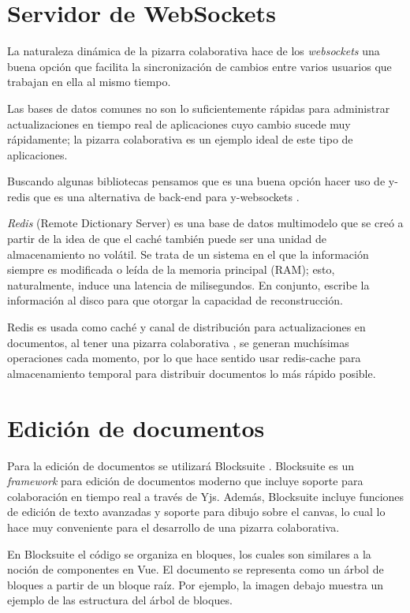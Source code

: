 \documentclass[a4paper, oneside, final]{scrartcl}
\begin{document}
\section{Servidor de WebSockets}
La naturaleza dinámica de la pizarra colaborativa
hace de los \textit{websockets} una buena opción que facilita
 la sincronización de cambios entre
 varios usuarios que trabajan en ella al mismo tiempo.

Las bases de datos comunes no son lo suficientemente r\'apidas para administrar actualizaciones en tiempo real de aplicaciones cuyo cambio sucede muy rápidamente; la pizarra colaborativa es un ejemplo ideal de este tipo de aplicaciones.

Buscando algunas bibliotecas pensamos que es una buena opción hacer uso de y-redis que es una alternativa de back-end para y-websockets .

\textit{Redis} (Remote Dictionary Server) es una base de datos multimodelo que se cre\'o a partir de la idea de que el cach\'e tambi\'en puede ser una unidad de almacenamiento no vol\'atil. Se trata de un sistema en el que la informaci\'on siempre es modificada o le\'ida de la memoria principal (RAM); esto, naturalmente, induce una latencia de milisegundos. En conjunto, escribe la informaci\'on al disco para que otorgar la capacidad de reconstrucci\'on.

Redis es usada como cach\'e y canal de distribuci\'on para actualizaciones en documentos, al tener una pizarra colaborativa , se generan much\'isimas operaciones cada momento, por lo que hace sentido usar redis-cache para almacenamiento temporal para distribuir documentos lo más rápido posible.


\section{Edición de documentos}

Para la edición de documentos se utilizará Blocksuite \cite{unknown-author-no-date}. Blocksuite es un \textit{framework} para edición de documentos moderno que incluye soporte para colaboración en tiempo real a través de Yjs. Además, Blocksuite incluye funciones de edición de texto avanzadas y soporte para dibujo sobre el canvas, lo cual lo hace muy conveniente para el desarrollo de una pizarra colaborativa. 

En Blocksuite el código se organiza en bloques, los cuales son similares a la noción de componentes en Vue. El documento se representa como un árbol de bloques a partir de un bloque raíz. Por ejemplo, la imagen debajo muestra un ejemplo de las estructura del árbol de bloques.
\end{document}
